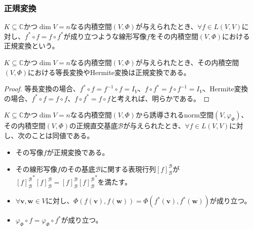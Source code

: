 \documentclass[dvipdfmx]{jsarticle}
\begin{document}
\subsubsection{正規変換}%
\begin{dfn}
$K \subseteq \mathbb{C}$かつ$\dim V = n$なる内積空間$(V,\varPhi)$が与えられたとき、$\forall f \in L(V,V)$に対し、$f^{*} \circ f = f \circ f^{*}$が成り立つような線形写像$f$をその内積空間$(V,\varPhi)$における正規変換という。
\end{dfn}
\begin{thm}\label{2.3.8.13}
$K \subseteq \mathbb{C}$かつ$\dim V = n$なる内積空間$(V,\varPhi)$が与えられたとき、その内積空間$(V,\varPhi)$における等長変換やHermite変換は正規変換である。
\end{thm}
\begin{proof}
等長変換の場合、$f^{*} \circ f = f^{- 1} \circ f = I_{V}$、$f \circ f^{*} = f \circ f^{- 1} = I_{V}$、Hermite変換の場合、$f^{*} \circ f = f \circ f$、$f \circ f^{*} = f \circ f$と考えれば、明らかである。
\end{proof}
\begin{thm}\label{2.3.8.14}
$K \subseteq \mathbb{C}$かつ$\dim V = n$なる内積空間$(V,\varPhi)$から誘導されるnorm空間$\left( V,\varphi_{\varPhi} \right)$、その内積空間$(V,\varPhi)$の正規直交基底$\mathcal{B}$が与えられたとき、$\forall f \in L(V,V)$に対し、次のことは同値である。
\begin{itemize}
\item
  その写像$f$が正規変換である。
\item
  その線形写像$f$のその基底$\mathcal{B}$に関する表現行列$[ f]_{\mathcal{B}}^{\mathcal{B}}$が${[ f]_{\mathcal{B}}^{\mathcal{B}}}^{*}[ f]_{\mathcal{B}}^{\mathcal{B}} = [ f]_{\mathcal{B}}^{\mathcal{B}}{[ f]_{\mathcal{B}}^{\mathcal{B}}}^{*}$を満たす。
\item
  $\forall\mathbf{v},\mathbf{w} \in V$に対し、$\varPhi\left( f\left( \mathbf{v} \right),f\left( \mathbf{w} \right) \right) = \varPhi\left( f^{*}\left( \mathbf{v} \right),f^{*}\left( \mathbf{w} \right) \right)$が成り立つ。
\item
  $\varphi_{\varPhi} \circ f = \varphi_{\varPhi} \circ f^{*}$が成り立つ。
\end{itemize}
\end{thm}
\end{document}
